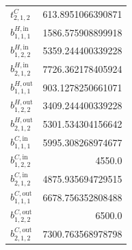 \documentclass{article}%
\begin{document}
\begin{multicols*}{3}
\begin{supertabular}{lr}
	$t_{2,1,2}^{C}$ & 613.8951066390871 \\%
	$b_{1,1,1}^{H,\text{in}}$ & 1586.575908899918 \\%
	$b_{1,2,2}^{H,\text{in}}$ & 5359.244400339228 \\%
	$b_{2,1,2}^{H,\text{in}}$ & 7726.362178405924 \\%
	$b_{1,1,1}^{H,\text{out}}$ & 903.1278250661071 \\%
	$b_{1,2,2}^{H,\text{out}}$ & 3409.244400339228 \\%
	$b_{2,1,2}^{H,\text{out}}$ & 5301.534304156642 \\%
	$b_{1,1,1}^{C,\text{in}}$ & 5995.308268974677 \\%
	$b_{1,2,2}^{C,\text{in}}$ & 4550.0 \\%
	$b_{2,1,2}^{C,\text{in}}$ & 4875.935694729515 \\%
	$b_{1,1,1}^{C,\text{out}}$ & 6678.756352808488 \\%
	$b_{1,2,2}^{C,\text{out}}$ & 6500.0 \\%
	$b_{2,1,2}^{C,\text{out}}$ & 7300.763568978798 \\%
\end{supertabular}%
\end{multicols*}%
\clearpage%
\end{document}
